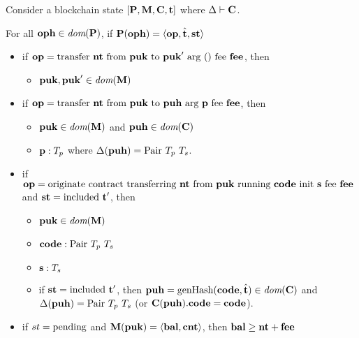 \documentclass[a4paper]{llncs}
\begin{document}
Consider a blockchain state  $[\PENDING, \MANAGERS, \CONTRACTORS,
\TIME]$ where $\Delta \vdash \CONTRACTORS$.

For all $\OPH\in\DOM (\PENDING)$,
if  $\PENDING (\OPH) =  \Angle{\OP, \hat\TIME, \STATUS}$
\begin{itemize}
\item if $\OP = \TRANSFER\NTEZ\PUK{\PUK'}\MTEZ$, then
\begin{itemize}
  \item
  $\PUK, \PUK' \in \DOM (\MANAGERS)$
\end{itemize}
\item if $\OP = \TRANSFER[\PARAMETER]\NTEZ\PUK\PUH\MTEZ$, then
  \begin{itemize}
  \item $\PUK \in \DOM (\MANAGERS)$ and $\PUH\in\DOM (\CONTRACTORS)$
  \item $\PARAMETER : \TYPE_p$ where $\Delta (\PUH)  =\TPAIR\ \TYPE_p\ \TYPE_s$. 
  \end{itemize}
  
\item if $\OP = \ORIGINATE\NTEZ\PUK\CODE\STRING\MTEZ$ and $\STATUS =
  \STATUSINCLUDED\ \TIME'$, then
   \begin{itemize}
   \item $\PUK \in \DOM (\MANAGERS)$
  \item $\CODE : \TPAIR\ \TYPE_p\ \TYPE_s$
  \item $\STRING : \TYPE_s$
  \item if $\STATUS =
  \STATUSINCLUDED\ \TIME'$, then $\PUH =\GENERATEHASH (\CODE, \hat\TIME) \in \DOM (\CONTRACTORS)$ and $\Delta (\PUH)  =\TPAIR\ \TYPE_p\ \TYPE_s$ (or $\CONTRACTORS(\PUH).\CODE = \CODE$).

  \end{itemize}
  
 \item if $st = \STATUSPENDING$ and $\MANAGERS(\PUK) = \Angle{\BAL,
     \COU}$, then $\BAL \ge \NTEZ +  \MTEZ$ 
\end{itemize}
\end{document}
